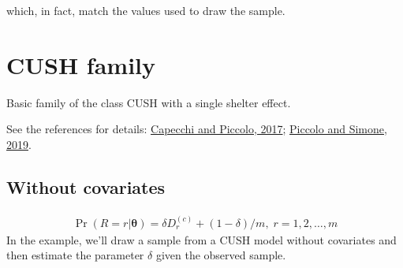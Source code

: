 \documentclass[letterpaper,10pt,english]{sphinxmanual}
\begin{document}
\sphinxAtStartPar
which, in fact, match the values used to draw the sample.


\section{CUSH family}
\label{\detokenize{manual:cush-family}}
\sphinxAtStartPar
Basic family of the class CUSH with a single shelter effect.

\sphinxAtStartPar
See the references for details: \hyperlink{cite.references:id11}{Capecchi and Piccolo, 2017}; \hyperlink{cite.references:id3}{Piccolo and Simone, 2019}.


\subsection{Without covariates}
\label{\detokenize{manual:cush-without-covariates}}\label{\detokenize{manual:id22}}
\sphinxAtStartPar
{}
\begin{equation*}
\begin{split}\Pr(R=r|\pmb\theta) = \delta D_r^{(c)} + (1-\delta)/m
,\; r=1,2,\ldots,m\end{split}
\end{equation*}
\sphinxAtStartPar
In the example, we’ll draw a sample from a CUSH model without covariates and
then estimate the parameter \(\delta\) given the observed sample.
\end{document}

